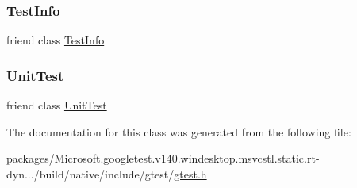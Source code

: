 \mbox{\label{classtesting_1_1_test_result_a4c49c2cdb6c328e6b709b4542f23de3c}} 
\subsubsection{\texorpdfstring{TestInfo}{TestInfo}}
{\footnotesize\ttfamily friend class \mbox{\hyperlink{classtesting_1_1_test_info}{Test\+Info}}\hspace{0.3cm}{\ttfamily [friend]}}

\mbox{\label{classtesting_1_1_test_result_a832b4d233efee1a32feb0f4190b30d39}} 
\subsubsection{\texorpdfstring{UnitTest}{UnitTest}}
{\footnotesize\ttfamily friend class \mbox{\hyperlink{classtesting_1_1_unit_test}{Unit\+Test}}\hspace{0.3cm}{\ttfamily [friend]}}



The documentation for this class was generated from the following file\+:\begin{DoxyCompactItemize}
\item 
packages/\+Microsoft.\+googletest.\+v140.\+windesktop.\+msvcstl.\+static.\+rt-\/dyn.../build/native/include/gtest/\mbox{\hyperlink{gtest_8h}{gtest.\+h}}\end{DoxyCompactItemize}
